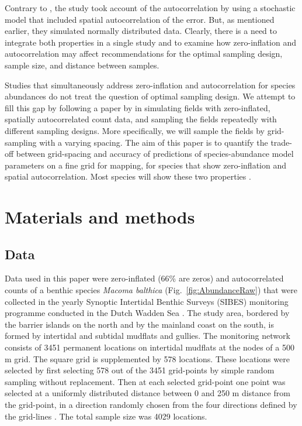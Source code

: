 \documentclass[review]{elsarticle}
\begin{document}
Contrary to \citet{tyre2003}, the \citeauthor{bijleveld2012} study took account of the autocorrelation by using a stochastic model that included spatial autocorrelation of the error. But, as mentioned earlier, they simulated normally distributed data. Clearly, there is a need to integrate both properties in a single study and to examine how zero-inflation and autocorrelation may affect recommendations for the optimal sampling design, sample size, and distance between samples.

Studies that simultaneously address zero-inflation and autocorrelation for species abundances \citep[see e.g.][]{recta2012, boyd2015} do not treat the question of optimal sampling design.  We attempt to fill this gap by following a paper by \citet{lyashevska2016a} in simulating fields with zero-inflated, spatially autocorrelated count data, and sampling the fields repeatedly with different sampling designs. More specifically, we will sample the fields by grid-sampling with a varying spacing. The aim of this paper is to quantify the trade-off between grid-spacing and accuracy of predictions of species-abundance model parameters on a fine grid for mapping, for species that show zero-inflation and spatial autocorrelation. Most species will show these two properties \citep[see][and references therein]{martin2005}.

\section{Materials and methods} \label{sec:methods}

\subsection{Data}

Data used in this paper were zero-inflated (66\% are zeros) and autocorrelated counts of a benthic species \textit{Macoma balthica} (Fig.~\ref{fig:AbundanceRaw}) that were collected in the yearly Synoptic Intertidal Benthic Surveys (SIBES) monitoring programme conducted in the Dutch Wadden Sea \citep{bijleveld2012, compton2013}. The study area, bordered by the barrier islands on the north and by the mainland coast on the south, is formed by intertidal and subtidal mudflats and gullies. The monitoring network consists of 3451 permanent locations on intertidal mudflats at the nodes of a 500 m grid. The square grid is supplemented by 578 locations. These locations were selected by first selecting 578 out of the 3451 grid-points by simple random sampling without replacement. Then at each selected grid-point one point was selected at a uniformly distributed distance between 0 and 250 m distance from the grid-point, in a direction randomly chosen from the four directions defined by the grid-lines \citep{bijleveld2012}. The total sample size was 4029 locations.
\end{document}
